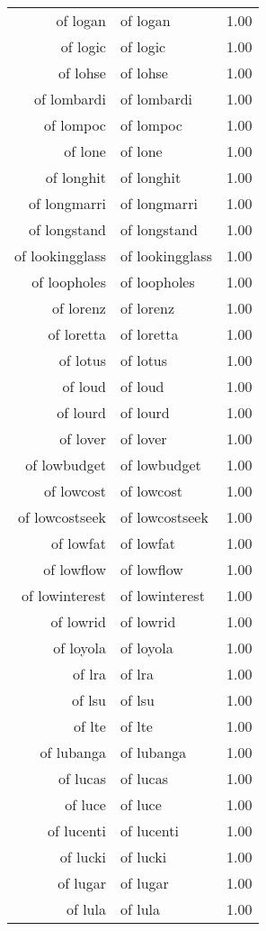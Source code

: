 \begin{table}[ht]
\begin{tabular}{rlr}
  of logan & of logan & 1.00 \\ 
  of logic & of logic & 1.00 \\ 
  of lohse & of lohse & 1.00 \\ 
  of lombardi & of lombardi & 1.00 \\ 
  of lompoc & of lompoc & 1.00 \\ 
  of lone & of lone & 1.00 \\ 
  of longhit & of longhit & 1.00 \\ 
  of longmarri & of longmarri & 1.00 \\ 
  of longstand & of longstand & 1.00 \\ 
  of lookingglass & of lookingglass & 1.00 \\ 
  of loopholes & of loopholes & 1.00 \\ 
  of lorenz & of lorenz & 1.00 \\ 
  of loretta & of loretta & 1.00 \\ 
  of lotus & of lotus & 1.00 \\ 
  of loud & of loud & 1.00 \\ 
  of lourd & of lourd & 1.00 \\ 
  of lover & of lover & 1.00 \\ 
  of lowbudget & of lowbudget & 1.00 \\ 
  of lowcost & of lowcost & 1.00 \\ 
  of lowcostseek & of lowcostseek & 1.00 \\ 
  of lowfat & of lowfat & 1.00 \\ 
  of lowflow & of lowflow & 1.00 \\ 
  of lowinterest & of lowinterest & 1.00 \\ 
  of lowrid & of lowrid & 1.00 \\ 
  of loyola & of loyola & 1.00 \\ 
  of lra & of lra & 1.00 \\ 
  of lsu & of lsu & 1.00 \\ 
  of lte & of lte & 1.00 \\ 
  of lubanga & of lubanga & 1.00 \\ 
  of lucas & of lucas & 1.00 \\ 
  of luce & of luce & 1.00 \\ 
  of lucenti & of lucenti & 1.00 \\ 
  of lucki & of lucki & 1.00 \\ 
  of lugar & of lugar & 1.00 \\ 
  of lula & of lula & 1.00 \\ 

\end{tabular}
\end{table}
